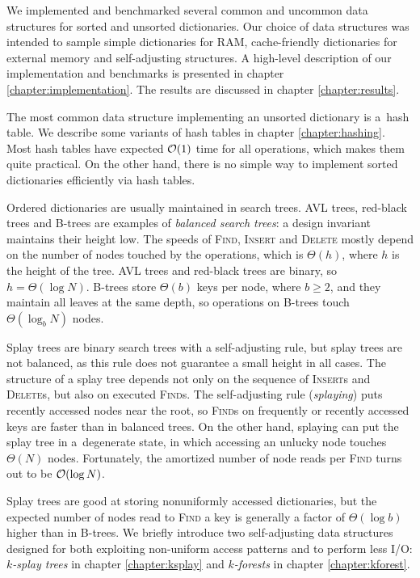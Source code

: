 We implemented and benchmarked several common and uncommon data structures
for sorted and unsorted dictionaries. Our choice of data structures was
intended to sample simple dictionaries for RAM, cache-friendly dictionaries
for external memory and self-adjusting structures.
A high-level description of our implementation and benchmarks is presented
in chapter \ref{chapter:implementation}. The results are discussed in
chapter \ref{chapter:results}.

The most common data structure implementing an unsorted dictionary is a~hash
table. We describe some variants of hash tables in chapter \ref{chapter:hashing}.
Most hash tables have expected $\mathcal{O}(1)$ time for all operations, which
makes them quite practical. On the other hand, there is no simple way to
implement sorted dictionaries efficiently via hash tables.

Ordered dictionaries are usually maintained in search trees.
AVL trees, red-black trees and B-trees are examples of \emph{balanced search
trees}: a design invariant maintains their height low. The speeds
of \textsc{Find}, \textsc{Insert} and \textsc{Delete} mostly depend
on the number of nodes touched by the operations, which is $\Theta(h)$, where
$h$ is the height of the tree. AVL trees and red-black trees are binary, so
$h=\Theta(\log N)$. B-trees store $\Theta(b)$ keys per node, where $b\geq 2$,
and they maintain all leaves at the same depth, so operations on B-trees
touch $\Theta(\log_b N)$ nodes.

Splay trees are binary search trees with a self-adjusting rule, but splay
trees are not balanced, as this rule does not guarantee a small height in all
cases. The structure of a splay tree depends not only on the sequence of
\textsc{Insert}s and \textsc{Delete}s, but also on executed \textsc{Find}s.
The self-adjusting rule (\emph{splaying}) puts recently accessed nodes
near the root, so \textsc{Find}s on frequently or recently accessed keys
are faster than in balanced trees. On the other hand, splaying can put
the splay tree in a~degenerate state, in which accessing an unlucky node
touches $\Theta(N)$ nodes. Fortunately, the amortized number of node
reads per \textsc{Find} turns out to be $\mathcal{O}(\log N)$.

Splay trees are good at storing nonuniformly accessed dictionaries, but
the expected number of nodes read to \textsc{Find} a key is generally a factor
of $\Theta(\log b)$ higher than in B-trees. We briefly introduce two
self-adjusting data structures designed for both exploiting non-uniform
access patterns and to perform less I/O: \emph{$k$-splay trees} in chapter
\ref{chapter:ksplay} and \emph{$k$-forests} in chapter \ref{chapter:kforest}.

